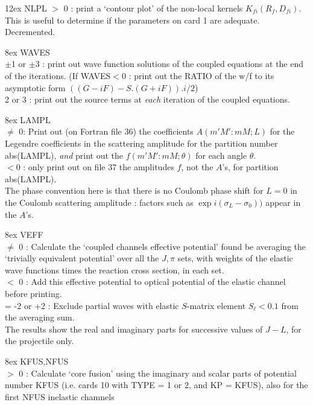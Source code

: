 \documentclass[11pt]{book}
\begin{document}
\hangindent 12ex
NLPL   $>$ 0 : print a `contour plot' of the non-local kernels
$K_{fi}(R_{f},D_{fi})$.  This is useful to determine if the parameters on card 1
are adequate.  Decremented.

\hangindent 8ex  WAVES
\\  $\pm$1 or $\pm$3 : print out wave function solutions of the coupled
equations at the end of the iterations.
(If WAVES$<$0 : print out the RATIO of the w/f to its asymptotic
form $((G-iF) - S.(G+iF)).i/2$)
\\  2 or 3     : print out the source terms at
{\em each} iteration of the coupled equations.



\hangindent 8ex  LAMPL
\\  $\neq$ 0: Print out (on Fortran file 36)
the coefficients $A(m'M':mM; L)$ for the Legendre
coefficients in the scattering amplitude for the partition number
abs(LAMPL),
{\em and}
print out the $f(m'M':mM; \theta)$ for each angle $\theta$.
\\ $<$0 : only print out on file 37 the amplitudes $f$, not the $A$'s,
for partition abs(LAMPL).
\\
The phase convention here is that there is no Coulomb phase shift
for $L = 0$ in the Coulomb scattering amplitude : factors such as
$\exp i(\sigma_L-\sigma_0))$  appear in the $A$'s.



\hangindent 8ex
VEFF
\\  $\neq$ 0 : Calculate the `coupled channels effective potential'
found be averaging the `trivially equivalent potential' over all
the $J,\pi$ sets, with weights of the elastic wave functions
times the reaction cross section, in each set.
\\  $<$  0 : Add this effective potential to optical potential
of the elastic channel before printing.
\\  = -2 or +2 : Exclude partial waves with elastic $S$-matrix element
$S_\ell< 0.1$ from the averaging sum.
\\ The results show the real and imaginary parts for successive
values of $J-L$, for the projectile only.





\hangindent 8ex
KFUS,NFUS
\\  $>$ 0 :  Calculate `core fusion' using the imaginary and scalar
parts of potential number KFUS (i.e. cards 10 with TYPE = 1 or 2,
and KP = KFUS), also for the first NFUS inelastic chamnels
\end{document}
